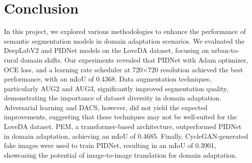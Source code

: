 \documentclass[10pt,twocolumn,letterpaper]{article}
\begin{document}
\section{Conclusion}

In this project, we explored various methodologies to enhance the performance of semantic segmentation models in domain adaptation scenarios. We evaluated the DeepLabV2 and PIDNet models on the LoveDA dataset, focusing on urban-to-rural domain shifts. Our experiments revealed that PIDNet with Adam optimizer, OCE loss, and a learning rate scheduler at 720×720 resolution achieved the best performance, with an mIoU of 0.4368. Data augmentation techniques, particularly AUG2 and AUG3, significantly improved segmentation quality, demonstrating the importance of dataset diversity in domain adaptation. Adversarial learning and DACS, however, did not yield the expected improvements, suggesting that these techniques may not be well-suited for the LoveDA dataset. PEM, a transformer-based architecture, outperformed PIDNet in domain adaptation, achieving an mIoU of 0.4685. Finally, CycleGAN-generated fake images were used to train PIDNet, resulting in an mIoU of 0.3901, showcasing the potential of image-to-image translation for domain adaptation. 



\end{document}
